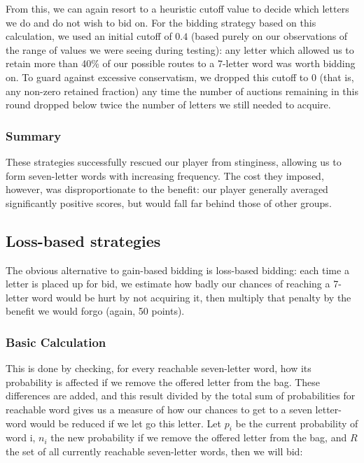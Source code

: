 \documentclass[11pt]{article}
\begin{document}
From this, we can again resort to a heuristic cutoff value to decide which letters we do and do not wish to bid on.  For the bidding strategy based on this calculation, we used an initial cutoff of $0.4$ (based purely on our observations of the range of values we were seeing during testing): any letter which allowed us to retain more than 40\% of our possible routes to a 7-letter word was worth bidding on.  To guard against excessive conservatism, we  dropped this cutoff to  $0$ (that is, any non-zero retained fraction) any time the number of auctions remaining in this round dropped below twice the number of letters we still needed to acquire.

\subsubsection{Summary}

These strategies successfully rescued our player from stinginess, allowing us to form seven-letter words with increasing frequency.  The cost they imposed, however, was disproportionate to the benefit: our player generally averaged significantly positive scores, but would fall far behind those of other groups.

\subsection{Loss-based strategies}

The obvious alternative to gain-based bidding is loss-based bidding: each time a letter is placed up for bid, we estimate how badly our chances of reaching a 7-letter word would be hurt by not acquiring it, then multiply that penalty by the benefit we would forgo (again, 50 points).  

\subsubsection{Basic Calculation}

This is done by checking, for every reachable seven-letter word, how its probability is affected if we remove the offered letter from the bag. These differences are added, and this result divided by the total sum of probabilities for reachable word gives us a measure of how our chances to get to a seven letter-word would be reduced if we let go this letter. Let $p_i$ be the current probability of word i, $n_i$ the new probability if we remove the offered letter from the bag, and $R$ the set of all currently reachable seven-letter words, then we will bid:
\end{document}
